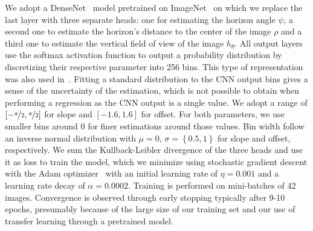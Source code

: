 We adopt a DenseNet~\cite{Huang2016} model pretrained on ImageNet~\cite{Russakovsky2015} on which we replace the last layer with three separate heads: one for estimating the horizon angle $\psi$, a second one to estimate the horizon's distance to the center of the image $\rho$ and a third one to estimate the vertical field of view of the image $h_{\theta}$.
All output layers use the softmax activation function to output a probability distribution by discretizing their respective parameter into 256 bins. This type of representation was also used in~\cite{Workman2016}. Fitting a standard distribution to the CNN output bins gives a sense of the uncertainty of the estimation, which is not possible to obtain when performing a regression as the CNN output is a single value. We adopt a range of $\left[ -\nicefrac{\pi}{2}, \nicefrac{\pi}{2} \right]$ for slope and $\left[ -1.6, 1.6\right]$ for offset. For both parameters, we use smaller bins around 0 for finer estimations around those values. Bin width follow an inverse normal distribution with $\mu=0,\, \sigma=\left\{ 0.5, 1 \right\}$ for slope and offset, respectively. We sum the Kullback-Leibler divergence of the three heads and use it as loss to train the model, which we minimize using stochastic gradient descent with the Adam optimizer~\cite{kingma-iclr-15} with an initial learning rate of $\eta = 0.001$ and a learning rate decay of $ \alpha = 0.0002$. Training is performed on mini-batches of 42 images. Convergence is observed through early stopping typically after 9-10 epochs, presumably because of the large size of our training set and our use of transfer learning through a pretrained model.

